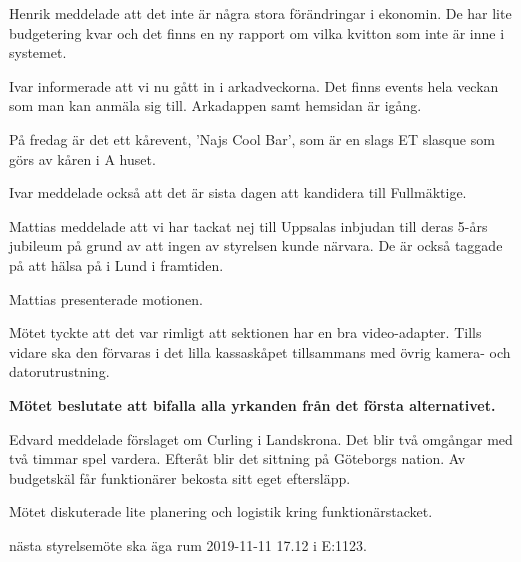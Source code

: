 \documentclass[10pt]{article}
\begin{document}
\begin{paragrafer}
\begin{paragrafer}
Henrik meddelade att det inte är några stora förändringar i ekonomin. De har lite budgetering kvar och det finns en ny rapport om vilka kvitton som inte är inne i systemet.  

Ivar informerade att vi nu gått in i arkadveckorna. Det finns events hela veckan som man kan anmäla sig till. Arkadappen samt hemsidan är igång. 

På fredag är det ett kårevent, 'Najs Cool Bar', som är en slags ET slasque som görs av kåren i A huset. 

Ivar meddelade också att det är sista dagen att kandidera till Fullmäktige. 


Mattias meddelade att vi har tackat nej till Uppsalas inbjudan till deras 5-års jubileum på grund av att ingen av styrelsen kunde närvara. De är också taggade på att hälsa på i Lund i framtiden. 



\end{paragrafer}


Mattias presenterade motionen. 

Mötet tyckte att det var rimligt att sektionen har en bra video-adapter. Tills vidare ska den förvaras i det lilla kassaskåpet tillsammans med övrig kamera- och datorutrustning. 

\textbf{Mötet beslutate att bifalla alla yrkanden från det första alternativet. } 

 
Edvard meddelade förslaget om Curling i Landskrona. Det blir två omgångar med två timmar spel vardera. Efteråt blir det sittning på Göteborgs nation. Av budgetskäl får funktionärer bekosta sitt eget eftersläpp.

Mötet diskuterade lite planering och logistik kring funktionärstacket. 

\Mba nästa styrelsemöte ska äga rum 2019-11-11 17.12 i E:1123.



\end{paragrafer}
\end{document}
